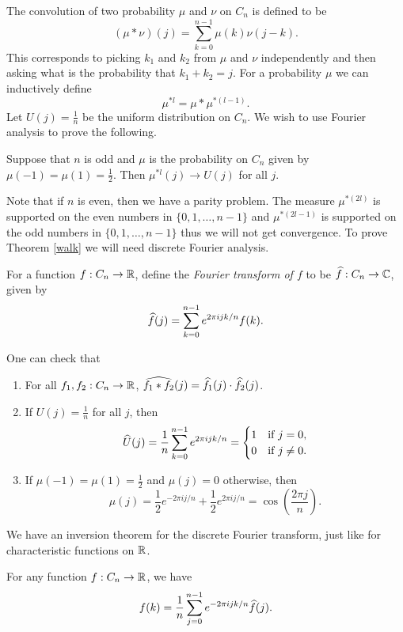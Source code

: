 The convolution of two probability $\mu$ and $\nu$ on $C_n$ is defined to be
\[(\mu * \nu)(j) = \sum_{k=0}^{n-1} \mu(k)\nu(j-k). \]
This corresponds to picking $k_1$ and $k_2$ from $\mu$ and $\nu$ independently and then asking what is the probability that $k_1+k_2 = j$. For a probability $\mu$ we can inductively define
\[\mu^{*l} = \mu*\mu^{*(l-1)}. \]
Let $U(j)=\frac{1}{n}$ be the uniform distribution on $C_n$. We wish to use Fourier analysis to prove the following.
\begin{thrm}\label{walk}
    Suppose that $n$ is odd and $\mu$ is the probability on $C_n$ given by $\mu(-1)=\mu(1)=\frac{1}{2}$. Then $\mu^{*l}(j) \to U(j)$ for all $j$.
\end{thrm}
Note that if $n$ is even, then we have a parity problem. The measure $\mu^{*(2l)}$ is supported on the even numbers in $\{0,1,\ldots,n-1\}$ and $\mu^{*(2l-1)}$ is supported on the odd numbers in $\{0,1,\ldots,n-1\}$ thus we will not get convergence. To prove Theorem \ref{walk} we will need discrete Fourier analysis.
\begin{defn}
    For a function $f:C_n \to {\mathbb R}$, define the \emph{Fourier transform of $f$} to be $\widehat{f}:C_n \to {\mathbb C}$, given by 
    \[\widehat{f}(j) = \sum_{k=0}^{n-1}e^{2\pi i j k/n}f(k). \]
\end{defn}
One can check that
\begin{enumerate}
    \item For all $f_1,f_2:C_n \to {\mathbb R}$, $\widehat{f_1*f_2}(j) = \widehat{f_1}(j)\cdot \widehat{f_2}(j)$.
    \item If $U(j) = \frac{1}{n}$ for all $j$, then
    \[\widehat{U}(j) = \frac{1}{n}\sum_{k=0}^{n-1} e^{2\pi i j k/n} = \begin{cases}
        1 &\text{if } j=0,\\
        0 & \text{if } j \neq 0.
    \end{cases} \]
    \item If $\mu(-1)=\mu(1)=\frac{1}{2}$ and $\mu(j)=0$ otherwise, then 
    \[\mu(j) =\frac{1}{2}e^{-2\pi i j/n}+\frac{1}{2}e^{2\pi i j/n} = \cos\left(\frac{2\pi j}{n}\right). \]
\end{enumerate}
We have an inversion theorem for the discrete Fourier transform, just like for characteristic functions on ${\mathbb R}$.
\begin{thrm}
    For any function $f:C_n \to {\mathbb R}$, we have
    \[f(k) = \frac{1}{n}\sum_{j=0}^{n-1} e^{-2\pi i j k/n}\widehat{f}(j). \]
\end{thrm}
